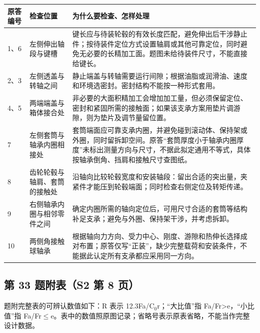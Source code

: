 \documentclass[zihao=5,a4paper,UTF8,fontset=fandol]{ctexart}
\begin{document}
\begin{longtable}{p{4.86cm}p{4.86cm}p{4.86cm}}
\toprule
原答编号 & 检查位置 & 为什么要检查、怎样处理 \\

\midrule
\endhead
1、6 & 左侧伸出轴段与键槽 & 键长应与待装轮毂的有效长度匹配，避免伸出后干涉静止件；按待装件定位方式设置轴肩或其他可靠定位，同时避免无必要的长精加工面。题图未给待装件尺寸，不能直接给键长。 \\
2、3 & 左侧透盖与转轴之间 & 静止端盖与转轴需要运行间隙；根据油脂或润滑油、速度和环境选密封。密封结构不能按一种形式套用。 \\
4、5 & 两端端盖与箱体接合处 & 非必要的大面积精加工会增加加工量，但必须保留定位、密封和紧固所需的接触面；如果该支承方案用垫片调游隙，则为垫片及调节量留位置。 \\
7 & 左侧套筒与轴承内圈相接处 & 套筒端面应可靠支承内圈，并避免碰到滚动体、保持架或外圈，同时留拆卸空间。原答“套筒厚度小于轴承内圈厚度”未标出测量方向与尺寸，不据此拟定通用不等式，具体按轴承倒角、挡肩和接触尺寸查图纸。 \\
8 & 齿轮轮毂与轴肩、套筒的接触处 & 沿轴向比较轮毂宽度和安装轴段：留出合适的突出量，夹紧件才能压到轮毂端面；同时检查右侧定位及转矩传递。 \\
9 & 右侧轴承内圈与相邻零件之间 & 确定内圈所需的轴向定位后，可用尺寸合适的套筒等结构补足支承；避免与外圈、保持架干涉，并考虑拆卸。 \\
10 & 两侧角接触球轴承 & 根据轴向力方向、受力中心、刚度、游隙和热伸长选择成对布置；原答仅写“正装”，缺少完整载荷和安装条件，不能据此认定所有支承都应采用同一方向。 \\
\bottomrule
\end{longtable}

\subsection{第 33 题附表（S2 第 8 页）}

题附完整表的可辨认数值如下：R 表示 12.3Fa/C$_{0}$r；“大比值”指 Fa/Fr>e，“小比值”指 Fa/Fr$\le$e。表中的数值照原图记录；省略号表示原表省略，不能当作完整设计数据。
\end{document}
